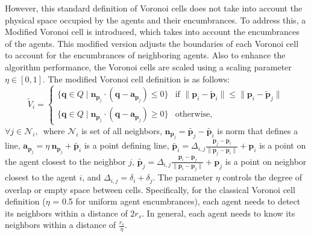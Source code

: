         However, this standard definition of Voronoi cells does not take into account the physical space occupied by the agents and their encumbrances. 
        To address this, a Modified Voronoi cell is introduced, which takes into account the encumbrances of the agents.
        This modified version adjusts the boundaries of each Voronoi cell to account for the encumbrances of neighboring agents.
        Also to enhance the algorithm performance, the Voronoi cells are scaled using a scaling parameter $\eta \in [0, 1]$.
        The modified Voronoi cell definition is as follows:
        \begin{equation}
            \label{eqn:voronoi_cell_account_encum}
            \tilde{V}_i = 
            \begin{cases}
                \{ \mathbf{q} \in Q \mid \mathbf{n}_{\mathbf{p}_j} \cdot (\mathbf{q} - \mathbf{a}_{\mathbf{p}_j}) \leq 0 \} & \text{if } \| \mathbf{p}_{i} - \tilde{\mathbf{p}}_{i} \| \leq \| \mathbf{p}_{i} - \tilde{\mathbf{p}}_{j} \| \\
                \{ \mathbf{q} \in Q \mid \mathbf{n}_{\mathbf{p}_j} \cdot (\mathbf{q} - \mathbf{a}_{\mathbf{p}_j}) \geq 0 \} & \text{otherwise,}
            \end{cases}
        \end{equation}
        $\forall j \in \mathcal{N}_i \text{, }$
        where $\mathcal{N}_i$ is set of all neighbors, $\mathbf{n}_{\mathbf{p}_j} = \tilde{\mathbf{p}_{j}} - \tilde{\mathbf{p}_{i}}$ is norm that defines a line, 
        $\mathbf{a}_{\mathbf{p}_{j}} = \eta \ \mathbf{n}_{\mathbf{p}_j} + \tilde{\mathbf{p}_{i}}$ is a point defining line,
        $\tilde{\mathbf{p}_{i}} = \Delta_{i,j}\frac{\mathbf{p}_{j} - \mathbf{p}_{i}}{\| \mathbf{p}_{j} - \mathbf{p}_{i} \|} + \mathbf{p}_i$ is a point on the agent closest to the neighbor $j$,
        $\tilde{\mathbf{p}_{j}} = \Delta_{i,j}\frac{\mathbf{p}_{i} - \mathbf{p}_{j}}{\| \mathbf{p}_{i} - \mathbf{p}_{j} \|} + \mathbf{p}_{j}$ is a point on neighbor closest to the agent $i$,
        and $\Delta_{i,j} = \delta_{i} + \delta_{j}$.
        The parameter $\eta$ controls the degree of overlap or empty space between cells.
        Specifically, for the classical Voronoi cell definition ($\eta$ = 0.5 for uniform agent encumbrances), each agent needs to detect its neighbors within a distance of $2r_{s}$.
        In general, each agent needs to know its neighbors within a distance of $\frac{r_s}{\eta}$.

